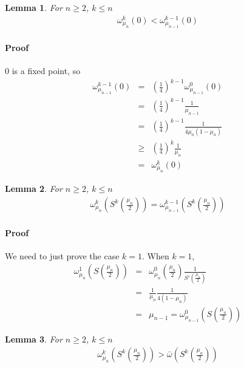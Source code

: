\documentclass{article}
\newtheorem{lemma}{Lemma}
\begin{document}
\begin{lemma}
For $n \ge 2$, $k \le n$
 \begin{eqnarray}
   \omega_{\mu_n}^k(0) <\omega_{\mu_{n-1}}^{k-1}(0)
 \end{eqnarray}
\end{lemma}
\paragraph{Proof}
$0$ is a fixed point, so 
  \begin{eqnarray}
     \omega_{\mu_{n-1}}^{k-1}(0) 
                    & = & \left( \frac{1}{4} \right)^{k-1} \omega_{\mu_{n-1}}^{0}(0) \nonumber\\
                    & = & \left( \frac{1}{4} \right)^{k-1} \frac{1}{\mu_{n-1}}\nonumber\\
                    & = & \left( \frac{1}{4} \right)^{k-1} \frac{1}{4{\mu_n}(1-\mu_n)}\nonumber\\
                    &\ge& \left( \frac{1}{4} \right)^{k} \frac{1}{\mu_n} \nonumber\\
                    & = & \omega_{\mu_n}^k(0)
  \end{eqnarray}
\begin{lemma}
For $n \ge 2$, $k \le n$
  \begin{eqnarray}
 \omega_{\mu_n}^k \left(S^k \left(\frac{\mu_n}{2}\right)\right) =\omega_{\mu_{n-1}}^{k-1} \left(S^k \left(\frac{\mu_n}{2}\right)\right)
  \end{eqnarray}
\end{lemma}
\paragraph{Proof}
We need to just prove the case $k=1$. When $k=1$,  
  \begin{eqnarray}
 \omega_{\mu_n}^1 \left(S \left(\frac{\mu_n}{2}\right)\right)
                    & = & \omega_{\mu_n}^0  \left(\frac{\mu_n}{2}\right) \frac{1}{S' \left( \frac{\mu_n}{2}\right)}\nonumber \\
                    & = & \frac{1}{\mu_n} \frac{1}{4(1-\mu_n)} \nonumber\\
                    & = & \mu_{n-1} = \omega_{\mu_{n-1}}^0 \left(S\left(\frac{\mu_n}{2}\right)\right)  
  \end{eqnarray}

\begin{lemma}
For $n \ge 2$, $k \le n$
 \begin{eqnarray}
  \omega_{\mu_n}^k \left(S^k \left(\frac{\mu_n}{2}\right)\right) > 
   \bar{\omega} \left(S^k \left(\frac{\mu_n}{2}\right)\right)
 \end{eqnarray} 
\end{lemma}
\end{document}
